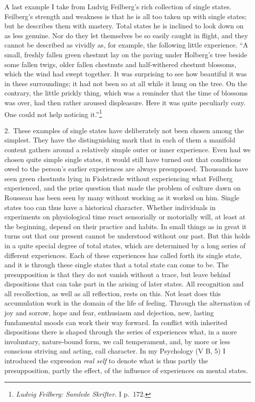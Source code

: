 \documentclass[12pt]{book}
\newcommand{\opage}[1]{\marginnote{\footnotesize\textit{[#1]}}}
\begin{document}
A last example I take from Ludvig Feilberg's rich collection of single states.
Feilberg's strength and weakness is that he is all too taken up with single
states; but he describes them with mastery. Total states he is inclined to look
down on as less genuine. Nor do they let themselves be so easily caught in
flight, and they cannot be described as vividly as, for example, the following
little experience. ``A small, freshly fallen green chestnut lay on the paving
under Holberg's tree beside some fallen twigs, older fallen chestnuts and
half-withered chestnut blossoms, which the wind had swept together. It was
surprising to see how beautiful it was in these surroundings; it had not been so
at all while it hung on the tree. On the contrary, the little prickly thing, which
was a reminder that the time of blossoms was over, had then rather aroused
displeasure. Here it was quite peculiarly cozy. One could not help noticing
it.''\footnote{\textit{Ludvig Feilberg: Samlede Skrifter.} I p.~172.}

2.~These examples of single states have deliberately not been chosen among the
simplest. They have the distinguishing mark that in each of them a manifold
content gathers around a relatively simple outer or inner experience. Even had
we chosen quite simple single states, it would still have turned out that
\opage{11}conditions owed to the person's earlier experiences are always
presupposed. Thousands have seen green chestnuts lying in Fiolstræde without
experiencing what Feilberg experienced, and the prize question that made the
problem of culture dawn on Rousseau has been seen by many without working as it
worked on him. Single states too can thus have a historical character. Whether
individuals in experiments on physiological time react sensorially or motorially
will, at least at the beginning, depend on their practice and habits. In small
things as in great it turns out that our present cannot be understood without
our past. But this holds in a quite special degree of total states, which are
determined by a long series of different experiences. Each of these experiences
has called forth its single state, and it is through these single states that a
total state can come to be. The presupposition is that they do not vanish
without a trace, but leave behind dispositions that can take part in the arising
of later states. All recognition and all recollection, as well as all
reflection, rests on this. Not least does this accumulation work in the domain
of the life of feeling. Through the alternation of joy and sorrow, hope and
fear, enthusiasm and dejection, new, lasting fundamental moods can work their way
forward. In conflict with inherited dispositions there is shaped through the
series of experiences what, in a more involuntary, nature-bound form, we call
temperament, and, by more or less conscious striving and acting, call character.
In my Psychology (V B, 5) I introduced the expression \emph{real self} to denote
what is thus partly the presupposition, partly the effect, of the influence of
experiences on mental states.
\end{document}

